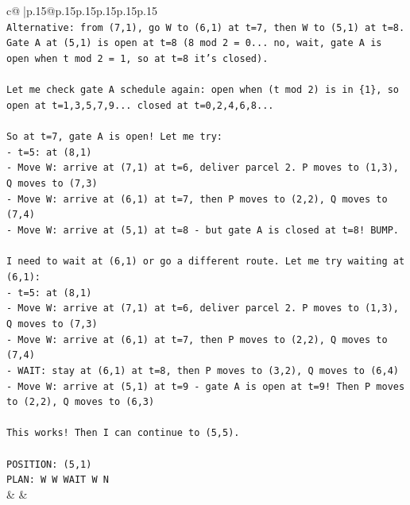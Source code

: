 \documentclass{article}
\begin{document}
{\begin{supertabular}{c@{$\;$}|p{.15\linewidth}@{}p{.15\linewidth}p{.15\linewidth}p{.15\linewidth}p{.15\linewidth}p{.15\linewidth}}
{{{\\ 
\texttt{Alternative: from (7,1), go W to (6,1) at t=7, then W to (5,1) at t=8. Gate A at (5,1) is open at t=8 (8 mod 2 = 0... no, wait, gate A is open when t mod 2 = 1, so at t=8 it's closed).} \\
\\ 
\texttt{Let me check gate A schedule again: open when (t mod 2) is in \{1\}, so open at t=1,3,5,7,9... closed at t=0,2,4,6,8...} \\
\\ 
\texttt{So at t=7, gate A is open! Let me try:} \\
\texttt{{-} t=5: at (8,1)} \\
\texttt{{-} Move W: arrive at (7,1) at t=6, deliver parcel 2. P moves to (1,3), Q moves to (7,3)} \\
\texttt{{-} Move W: arrive at (6,1) at t=7, then P moves to (2,2), Q moves to (7,4)} \\
\texttt{{-} Move W: arrive at (5,1) at t=8 {-} but gate A is closed at t=8! BUMP.} \\
\\ 
\texttt{I need to wait at (6,1) or go a different route. Let me try waiting at (6,1):} \\
\texttt{{-} t=5: at (8,1)} \\
\texttt{{-} Move W: arrive at (7,1) at t=6, deliver parcel 2. P moves to (1,3), Q moves to (7,3)} \\
\texttt{{-} Move W: arrive at (6,1) at t=7, then P moves to (2,2), Q moves to (7,4)} \\
\texttt{{-} WAIT: stay at (6,1) at t=8, then P moves to (3,2), Q moves to (6,4)} \\
\texttt{{-} Move W: arrive at (5,1) at t=9 {-} gate A is open at t=9! Then P moves to (2,2), Q moves to (6,3)} \\
\\ 
\texttt{This works! Then I can continue to (5,5).} \\
\\ 
\texttt{POSITION: (5,1)} \\
\texttt{PLAN: W W WAIT W N} \\
            }
        }
    }
    & & \\ \\


\end{supertabular}}
\end{document}
